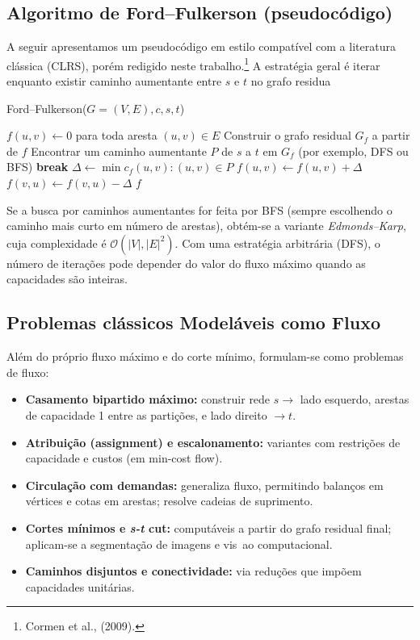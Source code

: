 \documentclass[12pt]{article}
\begin{document}
\subsection{Algoritmo de Ford–Fulkerson (pseudocódigo)} 

A seguir apresentamos um pseudocódigo em estilo compatível com a literatura clássica (CLRS), porém redigido neste trabalho.\footnote{Cormen et al., (2009).} A estratégia geral é iterar enquanto existir caminho aumentante entre $s$ e $t$ no grafo residua

\begin{algorithm}[H] 
\caption{Ford–Fulkerson($G=(V,E), c, s, t$)} \label{alg:ff}
\begin{algorithmic}[1] 
\State $f(u,v) \gets 0$ para toda aresta $(u,v)\in E$ \Repeat 
\State Construir o grafo residual $G_f$ a partir de $f$ 
\State Encontrar um caminho aumentante $P$ de $s$ a $t$ em $G_f$ (por exemplo, DFS ou BFS)  
\State \textbf{break} \EndIf 
\State $\Delta \gets \min{ c_f(u,v) : (u,v)\in P }$   
\State $f(u,v) \gets f(u,v) + \Delta$  
\State $f(v,u) \gets f(v,u) - \Delta$  \EndFor {} 
\State \Return $f$ 
\end{algorithmic}
\end{algorithm}

\noindent Se a busca por caminhos aumentantes for feita por BFS (sempre escolhendo o caminho mais curto em número de arestas), obtém-se a variante \emph{Edmonds–Karp}, cuja complexidade é $\mathcal{O}(|V|,|E|^2)$. Com uma estratégia arbitrária (DFS), o número de iterações pode depender do valor do fluxo máximo quando as capacidades são inteiras.


\subsection{Problemas clássicos Modeláveis como Fluxo} 

Além do próprio fluxo máximo e do corte mínimo, formulam-se como problemas de fluxo: 

\begin{itemize} 
\item \textbf{Casamento bipartido máximo:} construir rede $s\to$ lado esquerdo, arestas de capacidade 1 entre as partições, e lado direito $\to t$. 
\item \textbf{Atribuição (assignment) e escalonamento:} variantes com restrições de capacidade e custos (em min-cost flow). 
\item \textbf{Circulação com demandas:} generaliza fluxo, permitindo balanços em vértices e cotas em arestas; resolve cadeias de suprimento. 
\item \textbf{Cortes mínimos e \emph{s-t} cut:} computáveis a partir do grafo residual final; aplicam-se a segmentação de imagens e vis~ao computacional. 
\item \textbf{Caminhos disjuntos e conectividade:} via reduções que impõem capacidades unitárias. \end{itemize}
\end{document}
